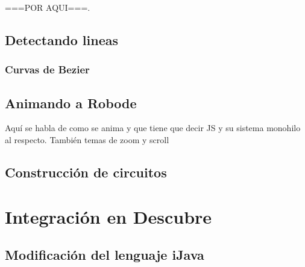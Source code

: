 {\color{green} ===POR AQUI===}.



\subsection{Detectando lineas}
\label{detectando-lineas}

\subsubsection{Curvas de Bezier}
\label{bezier}



\subsection{Animando a Robode}
\label{animando-robode}

Aquí se habla de como se anima y que tiene que decir JS y su sistema monohilo al respecto. También temas de zoom y scroll



\subsection{Construcción de circuitos}
\label{sec:construccion-circuitos}






\section{Integración en Descubre}
\label{sec:integracion-descubre}

\subsection{Modificación del lenguaje iJava}
\label{sec:modificacion-ijava}


